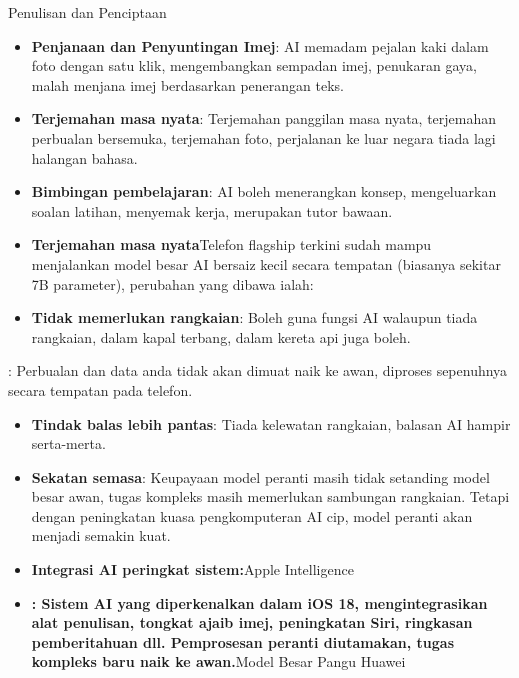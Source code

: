 Penulisan dan Penciptaan


\begin{itemize}
  \item \textbf{Penjanaan dan Penyuntingan Imej}: AI memadam pejalan kaki dalam foto dengan satu klik, mengembangkan sempadan imej, penukaran gaya, malah menjana imej berdasarkan penerangan teks.
  \item \textbf{Terjemahan masa nyata}: Terjemahan panggilan masa nyata, terjemahan perbualan bersemuka, terjemahan foto, perjalanan ke luar negara tiada lagi halangan bahasa.
  \item \textbf{Bimbingan pembelajaran}: AI boleh menerangkan konsep, mengeluarkan soalan latihan, menyemak kerja, merupakan tutor bawaan.
  \item \textbf{Terjemahan masa nyata}Telefon flagship terkini sudah mampu menjalankan model besar AI bersaiz kecil secara tempatan (biasanya sekitar 7B parameter), perubahan yang dibawa ialah:
  \item \textbf{Tidak memerlukan rangkaian}: Boleh guna fungsi AI walaupun tiada rangkaian, dalam kapal terbang, dalam kereta api juga boleh.
\end{itemize}


: Perbualan dan data anda tidak akan dimuat naik ke awan, diproses sepenuhnya secara tempatan pada telefon.

\begin{itemize}
  \item \textbf{Tindak balas lebih pantas}: Tiada kelewatan rangkaian, balasan AI hampir serta-merta.
  \item \textbf{Sekatan semasa}: Keupayaan model peranti masih tidak setanding model besar awan, tugas kompleks masih memerlukan sambungan rangkaian. Tetapi dengan peningkatan kuasa pengkomputeran AI cip, model peranti akan menjadi semakin kuat.
  \item \textbf{Integrasi AI peringkat sistem:}Apple Intelligence
  \item \textbf{: Sistem AI yang diperkenalkan dalam iOS 18, mengintegrasikan alat penulisan, tongkat ajaib imej, peningkatan Siri, ringkasan pemberitahuan dll. Pemprosesan peranti diutamakan, tugas kompleks baru naik ke awan.}Model Besar Pangu Huawei
\end{itemize}

